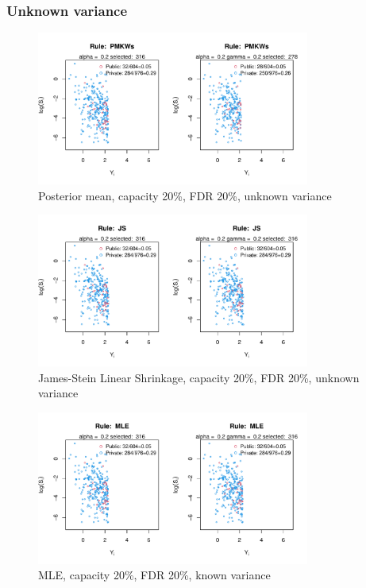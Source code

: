 \documentclass[12pt]{article}
\begin{document}
\newpage
\subsubsection{Unknown variance}
\label{section:unknown}

\begin{figure}[h!]
    \centering
    \includegraphics[width=0.8\textwidth]{../../Figures/2013-2022/GMM_fd/GLVmix/Left_0.2_0.2_PMKWs.pdf}
    \caption{Posterior mean, capacity 20\%, FDR 20\%, unknown variance}
\end{figure}

\begin{figure}[h!]
    \centering
    \includegraphics[width=0.8\textwidth]{../../Figures/2013-2022/GMM_fd/GLVmix/Left_0.2_0.2_JS.pdf}
    \caption{James-Stein Linear Shrinkage, capacity 20\%, FDR 20\%, unknown variance}
\end{figure}

\begin{figure}[h!]
    \centering
    \includegraphics[width=0.8\textwidth]{../../Figures/2013-2022/GMM_fd/GLVmix/Left_0.2_0.2_MLE.pdf}
    \caption{MLE, capacity 20\%, FDR 20\%, known variance}
\end{figure}
\end{document}
